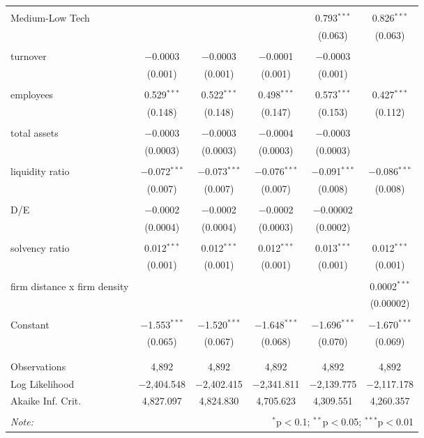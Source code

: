 \begin{table}[!htbp]
\begin{tabular}{@{\extracolsep{5pt}}lccccc}
  & & & & & \\ 
 Medium-Low Tech &  &  &  & 0.793$^{***}$ & 0.826$^{***}$ \\ 
  &  &  &  & (0.063) & (0.063) \\ 
  & & & & & \\ 
 turnover & $-$0.0003 & $-$0.0003 & $-$0.0001 & $-$0.0003 &  \\ 
  & (0.001) & (0.001) & (0.001) & (0.001) &  \\ 
  & & & & & \\ 
 employees & 0.529$^{***}$ & 0.522$^{***}$ & 0.498$^{***}$ & 0.573$^{***}$ & 0.427$^{***}$ \\ 
  & (0.148) & (0.148) & (0.147) & (0.153) & (0.112) \\ 
  & & & & & \\ 
 total assets & $-$0.0003 & $-$0.0003 & $-$0.0004 & $-$0.0003 &  \\ 
  & (0.0003) & (0.0003) & (0.0003) & (0.0003) &  \\ 
  & & & & & \\ 
 liquidity ratio & $-$0.072$^{***}$ & $-$0.073$^{***}$ & $-$0.076$^{***}$ & $-$0.091$^{***}$ & $-$0.086$^{***}$ \\ 
  & (0.007) & (0.007) & (0.007) & (0.008) & (0.008) \\ 
  & & & & & \\ 
 D/E & $-$0.0002 & $-$0.0002 & $-$0.0002 & $-$0.00002 &  \\ 
  & (0.0004) & (0.0004) & (0.0003) & (0.0002) &  \\ 
  & & & & & \\ 
 solvency ratio & 0.012$^{***}$ & 0.012$^{***}$ & 0.012$^{***}$ & 0.013$^{***}$ & 0.012$^{***}$ \\ 
  & (0.001) & (0.001) & (0.001) & (0.001) & (0.001) \\ 
  & & & & & \\ 
 firm distance x firm density &  &  &  &  & 0.0002$^{***}$ \\ 
  &  &  &  &  & (0.00002) \\ 
  & & & & & \\ 
 Constant & $-$1.553$^{***}$ & $-$1.520$^{***}$ & $-$1.648$^{***}$ & $-$1.696$^{***}$ & $-$1.670$^{***}$ \\ 
  & (0.065) & (0.067) & (0.068) & (0.070) & (0.069) \\ 
  & & & & & \\ 
\hline \\[-1.8ex] 
Observations & 4,892 & 4,892 & 4,892 & 4,892 & 4,892 \\ 
Log Likelihood & $-$2,404.548 & $-$2,402.415 & $-$2,341.811 & $-$2,139.775 & $-$2,117.178 \\ 
Akaike Inf. Crit. & 4,827.097 & 4,824.830 & 4,705.623 & 4,309.551 & 4,260.357 \\ 
\hline 
\hline \\[-1.8ex] 
\textit{Note:}  & \multicolumn{5}{r}{$^{*}$p$<$0.1; $^{**}$p$<$0.05; $^{***}$p$<$0.01} \\ 
\end{tabular} 
\end{table} 
